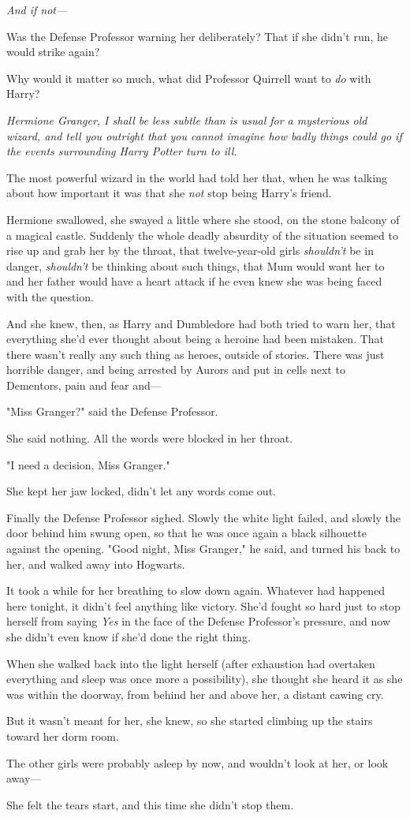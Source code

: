 \emph{And if not---}

Was the Defense Professor warning her deliberately? That if she didn't run, he
would strike again?

Why would it matter so much, what did Professor Quirrell want to \emph{do} with
Harry?

\emph{Hermione Granger, I shall be less subtle than is usual for a mysterious
old wizard, and tell you outright that you cannot imagine how badly
things could go if the events surrounding Harry Potter turn to ill.}

The most powerful wizard in the world had told her that, when he was talking
about how important it was that she \emph{not} stop being Harry's friend.

Hermione swallowed, she swayed a little where she stood, on the stone balcony
of a magical castle. Suddenly the whole deadly absurdity of the situation
seemed to rise up and grab her by the throat, that twelve-year-old girls
\emph{shouldn't} be in danger, \emph{shouldn't} be thinking about such things,
that Mum would want her to  and her father would have a heart attack if
he even knew she was being faced with the question.

And she knew, then, as Harry and Dumbledore had both tried to warn her, that
everything she'd ever thought about being a heroine had been mistaken. That
there wasn't really any such thing as heroes, outside of stories. There was
just horrible danger, and being arrested by Aurors and put in cells next to
Dementors, pain and fear and---

"Miss Granger?" said the Defense Professor.

She said nothing. All the words were blocked in her throat.

"I need a decision, Miss Granger."

She kept her jaw locked, didn't let any words come out.

Finally the Defense Professor sighed. Slowly the white light failed, and slowly
the door behind him swung open, so that he was once again a black silhouette
against the opening. "Good night, Miss Granger," he said, and turned his back
to her, and walked away into Hogwarts.

It took a while for her breathing to slow down again. Whatever had happened
here tonight, it didn't feel anything like victory. She'd fought so hard just
to stop herself from saying \emph{Yes} in the face of the Defense Professor's
pressure, and now she didn't even know if she'd done the right thing.

When she walked back into the light herself (after exhaustion had overtaken
everything and sleep was once more a possibility), she thought she heard it as
she was within the doorway, from behind her and above her, a distant cawing cry.

But it wasn't meant for her, she knew, so she started climbing up the stairs
toward her dorm room.

The other girls were probably asleep by now, and wouldn't look at her, or look
away---

She felt the tears start, and this time she didn't stop them.
